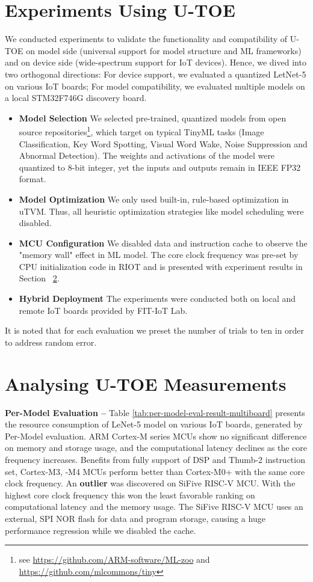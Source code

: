 \section{Experiments Using U-TOE}
We conducted experiments to validate the functionality and compatibility of U-TOE on model side (universal support for model structure and ML frameworks) and on device side (wide-spectrum support for IoT devices). Hence, we dived into two orthogonal directions: For device support, we evaluated a quantized LetNet-5 on various IoT boards; For model compatibility, we evaluated multiple models on a local STM32F746G discovery board. 
\begin{itemize}
    \item \textbf{Model Selection} We selected pre-trained, quantized models from open source repositories\footnote{see \url{https://github.com/ARM-software/ML-zoo} and \url{https://github.com/mlcommons/tiny}}, which target on typical TinyML tasks (Image Classification, Key Word Spotting, Visual Word Wake, Noise Suppression and Abnormal Detection). The weights and activations of the model were quantized to 8-bit integer, yet the inputs and outputs remain in IEEE FP32 format.
    \item \textbf{Model Optimization} We only used built-in, rule-based optimization in uTVM. Thus, all heuristic optimization strategies like model scheduling were disabled.
    \item \textbf{MCU Configuration} We disabled data and instruction cache to observe the "memory wall" effect in ML model. The core clock frequency was pre-set by CPU initialization code in RIOT and is presented with experiment results in Section ~\ref{sec:results}. 
    \item \textbf{Hybrid Deployment} The experiments were conducted both on local and remote IoT boards provided by FIT-IoT Lab. 
\end{itemize}
It is noted that for each evaluation we preset the number of trials to ten in order to address random error.

\section{Analysing U-TOE Measurements}
\label{sec:results}

{\bf Per-Model Evaluation --}
Table \ref{tab:per-model-eval-result-multiboard} presents the resource consumption of LeNet-5 model on various IoT boards, generated by Per-Model evaluation. ARM Cortex-M series MCUs show no significant difference on memory and storage usage, and the computational latency declines as the core frequency increases. Benefits from fully support of DSP and Thumb-2 instruction set, Cortex-M3, -M4 MCUs perform better than Cortex-M0+ with the same core clock frequency. An \textbf{outlier} was discovered on SiFive RISC-V MCU. With the highest core clock frequency this won the least favorable ranking on computational latency and the memory usage. The SiFive RISC-V MCU uses an external, SPI NOR flash for data and program storage, causing a huge performance regression while we disabled the cache.

